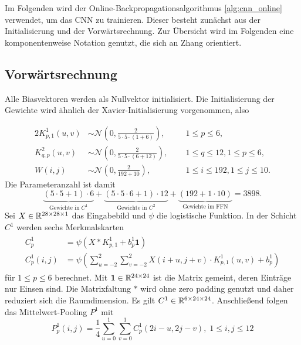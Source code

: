 Im Folgenden wird der Online-Backpropagationsalgorithmus \ref{alg:cnn_online} verwendet, um das CNN zu trainieren. Dieser besteht zunächst aus der Initialisierung und der Vorwärtsrechnung. Zur Übersicht wird im Folgenden eine komponentenweise Notation genutzt, die sich an Zhang \cite{key} orientiert. 

\subsection*{Vorwärtsrechnung}
Alle Biasvektoren werden als Nullvektor initialisiert. Die Initialisierung der Gewichte wird ähnlich der Xavier-Initialisierung \cite{DBLP:journals/jmlr/GlorotB10} vorgenommen, also

\begin{alignat*}{2}
    K^{1}_{p,1}(u,v) &\sim  \mathcal{N} \left(0, \frac{2}{5 \cdot 5 \cdot (1+6)}\right), \; \; && 1 \leq p \leq 6,\\
    K^{2}_{q,p}(u,v) &\sim  \mathcal{N} \left(0, \frac{2}{5 \cdot 5 \cdot (6+12)}\right),\; \; && 1 \leq q \leq 12, 1 \leq p \leq 6,\\
    W(i,j) &\sim \mathcal{N} \left(0, \frac{2}{192+10}\right), \; \; &&1 \leq i \leq 192 , 1 \leq j \leq 10.
\end{alignat*}
Die Parameteranzahl ist damit 
\begin{equation*}
    \underbrace{(5 \cdot 5 +1) \cdot 6}_{\text{Gewichte in $C^1$}}+\underbrace{(5 \cdot 5 \cdot 6+1) \cdot 12}_{\text{Gewichte in $C^2$}}+\underbrace{(192+1 \cdot 10)}_{\text{Gewichte im FFN}}=3898.
\end{equation*}
 Sei $X \in \mathbb{R}^{28 \times 28 \times 1}$ das Eingabebild und $\psi$ die logistische Funktion. In der Schicht $C^1$ werden sechs Merkmalskarten 
\begin{align*}
    \label{eq:C1_forw}
    \begin{split}
    C_p^1 &= \psi(X \ast K_{p,1}^1+b_p^1 \mathbf{1}) \\
    C_p^1(i,j)&=\psi \left(\sum_{u=-2}^2 \sum_{v=-2}^2 X(i+u,j+v) \cdot K_{p,1}^1(u,v) +b_p^1\right)
    \end{split}
\end{align*}
für $1 \leq p \leq 6$ berechnet. Mit $\mathbf{1} \in \mathbb{R}^{24 \times 24}$ ist die Matrix gemeint, deren Einträge nur Einsen sind. Die Matrixfaltung $\ast$ wird ohne zero padding genutzt und daher reduziert sich die Raumdimension. Es gilt $C^1 \in \mathbb{R}^{6 \times 24 \times 24}$. Anschließend folgen das Mittelwert-Pooling $P^1$ mit
\begin{equation*}
    \label{eq:P1_forw}
    P^1_p(i,j) =\frac{1}{4} \sum_{u=0}^1 \sum_{v=0}^1 C_p^1(2i-u, 2j-v), \; 1 \leq i,j \leq 12
\end{equation*}
